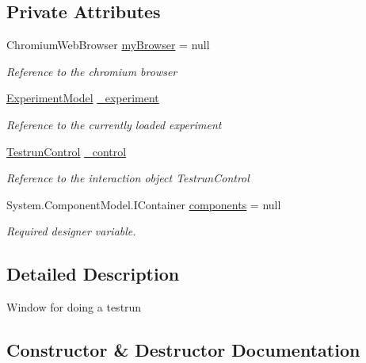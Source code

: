 \subsection*{Private Attributes}
\begin{DoxyCompactItemize}
\item 
Chromium\+Web\+Browser \hyperlink{class_web_analyzer_1_1_u_i_1_1_testrun_form_a8a98c5bfb1ce075cd3fbeadeb40f51fd}{my\+Browser} = null
\begin{DoxyCompactList}\small\item\em Reference to the chromium browser \end{DoxyCompactList}\item 
\hyperlink{class_web_analyzer_1_1_models_1_1_base_1_1_experiment_model}{Experiment\+Model} \hyperlink{class_web_analyzer_1_1_u_i_1_1_testrun_form_a49db47e745ac60b4d6cee8104f0ce918}{\+\_\+experiment}
\begin{DoxyCompactList}\small\item\em Reference to the currently loaded experiment \end{DoxyCompactList}\item 
\hyperlink{class_web_analyzer_1_1_u_i_1_1_interaction_objects_1_1_testrun_control}{Testrun\+Control} \hyperlink{class_web_analyzer_1_1_u_i_1_1_testrun_form_a9bf46961e50ac86c57418e529e87c561}{\+\_\+control}
\begin{DoxyCompactList}\small\item\em Reference to the interaction object Testrun\+Control \end{DoxyCompactList}\item 
System.\+Component\+Model.\+I\+Container \hyperlink{class_web_analyzer_1_1_u_i_1_1_testrun_form_a90f322118f120fb4bcc772f1d939d918}{components} = null
\begin{DoxyCompactList}\small\item\em Required designer variable. \end{DoxyCompactList}\end{DoxyCompactItemize}


\subsection{Detailed Description}
Window for doing a testrun 



\subsection{Constructor \& Destructor Documentation}
\hypertarget{class_web_analyzer_1_1_u_i_1_1_testrun_form_a874c60792a2a41b12490c8361336e261}{}

